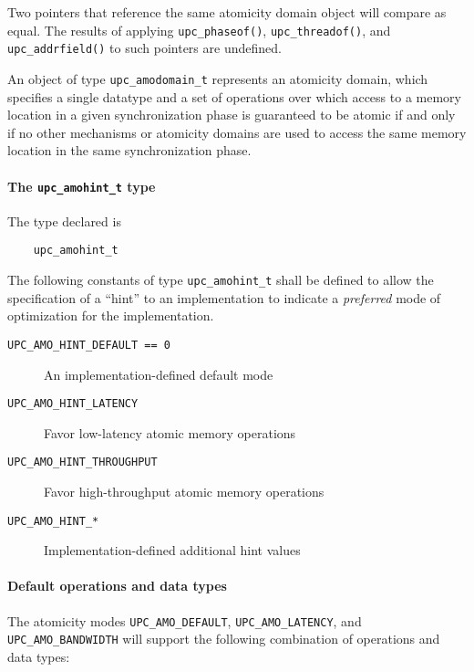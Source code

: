 \np Two pointers that reference the same atomicity domain object will compare
    as equal.  The results of applying {\tt upc\_phaseof()},
    {\tt upc\_threadof()}, and {\tt upc\_addrfield()} to such pointers are
    undefined.

\np An object of type {\tt upc\_amodomain\_t} represents an atomicity domain,
    which specifies a single datatype and a set of operations over which
    access to a memory location in a given synchronization phase is guaranteed
    to be atomic if and only if no other mechanisms or atomicity domains are
    used to access the same memory location in the same synchronization phase.

\paragraph{The {\tt upc\_amohint\_t} type}

\npf The type declared is
\begin{verbatim}
    upc_amohint_t
\end{verbatim}

\np The following constants of type {\tt upc\_amohint\_t} shall be defined
    to allow the specification of a ``hint'' to an implementation to indicate
    a \emph{preferred} mode of optimization for the implementation.
\begin{description}
  \item[{\tt UPC\_AMO\_HINT\_DEFAULT == 0}]
    An implementation-defined default mode
  \item[{\tt UPC\_AMO\_HINT\_LATENCY}]
    Favor low-latency atomic memory operations
  \item[{\tt UPC\_AMO\_HINT\_THROUGHPUT}]
    Favor high-throughput atomic memory operations
  \item[{\tt UPC\_AMO\_HINT\_*}]
    Implementation-defined additional hint values
\end{description}

\paragraph{Default operations and data types}
\label{upc-amo-types-ops}

\npf The atomicity modes {\tt UPC\_AMO\_DEFAULT}, {\tt UPC\_AMO\_LATENCY},
    and {\tt UPC\_AMO\_BANDWIDTH} will support the following combination of
    operations and data types:

